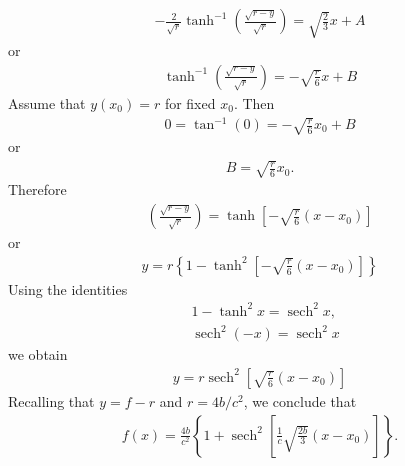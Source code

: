 \documentclass[12pt,reqno]{amsart}
\numberwithin{equation}{section}  %
\def\sech{\operatorname{sech}}
\begin{document}
%
\begin{equation*}
\begin{split}
  -\frac{2}{\sqrt{r}} \tanh^{-1}\left( \frac{\sqrt{r-y}}{\sqrt{r}} \right) =
  \sqrt{\frac{2}{3}}x + A
\end{split}
\end{equation*}
%
or
%
%
\begin{equation*}
\begin{split}
\tanh^{-1}\left( \frac{\sqrt{r-y}}{\sqrt{r}} \right) =
  -\sqrt{\frac{r}{6}}x + B
\end{split}
\end{equation*}
%
%
Assume that $y(x_{0}) = r$ for fixed $x_{0}$. Then
%
%
\begin{equation*}
\begin{split}
  0 = \tan^{-1}(0) = -\sqrt{\frac{r}{6}}x_{0} + B
\end{split}
\end{equation*}
%
or
%
%
\begin{equation*}
\begin{split}
B = \sqrt{\frac{r}{6}}x_{0}.
\end{split}
\end{equation*}
%
%
Therefore
%
%
%
\begin{equation*}
\begin{split}
\left( \frac{\sqrt{r-y}}{\sqrt{r}} \right) =
\tanh \left[ -\sqrt{\frac{r}{6}}(x - x_{0}) \right]
\end{split}
\end{equation*}
or
%
%
\begin{equation*}
\begin{split}
  y = r\left \{ 1 - \tanh^{2} \left[ -\sqrt{\frac{r}{6}}(x- x_{0}) \right] \right \}
\end{split}
\end{equation*}
%
%
Using the identities
%
%
\begin{equation*}
\begin{split}
  & 1 - \tanh^{2}x = \sech^{2}x,
  \\
  & \sech^{2}(-x) = \sech^{2}x
\end{split}
\end{equation*}
%
we obtain 
%
%
\begin{equation*}
\begin{split}
  y = r\sech^{2} \left[ \sqrt{\frac{r}{6}}(x- x_{0}) \right] 
\end{split}
\end{equation*}
%
%
Recalling that $y = f-r$ and $r = 4b/c^{2}$, we conclude that 
%
%
\begin{equation*}
\begin{split}
  f(x) = \frac{4b}{c^{2}}\left\{ 1 + \sech^{2} \left[ \frac{1}{c}
  \sqrt{\frac{2b}{3}} (x-x_{0}) \right] \right\}.
\end{split}
\end{equation*}
%
%
\end{document}
